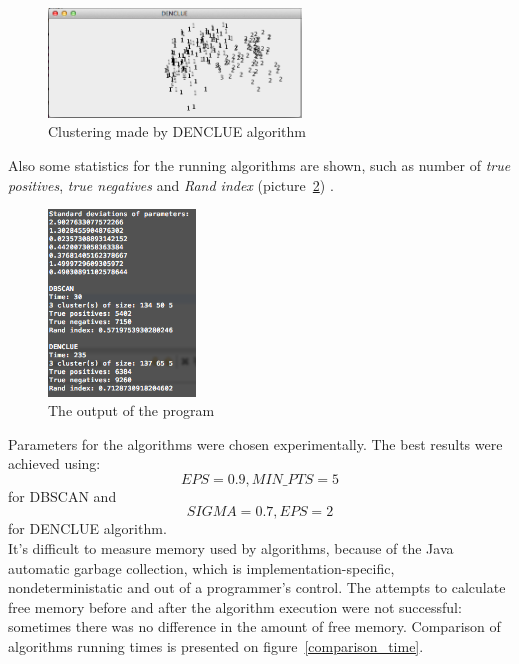 \documentclass[12pt, a4paper, notitlepage, oneside]{article}
\begin{document}
\begin{figure}[!ht]
 	\centering
	\includegraphics[width=0.6\textwidth]{images/denclue.png}
 	\caption[]
	{Clustering made by DENCLUE algorithm}
		\label{denclue}
	\end{figure}

Also some statistics for the running algorithms are shown, such as number of \textit{true positives}, \textit{true negatives} and \textit{Rand index} (picture~\ref{result}) \cite{rand}.

\begin{figure}[!ht]
 	\centering
	\includegraphics[width=0.35\textwidth]{images/results.png}
 	\caption[]
	{The output of the program}
		\label{result}
\end{figure}

Parameters for the algorithms were chosen experimentally. The best results were achieved using: 
$$EPS = 0.9, MIN\_PTS = 5$$
for DBSCAN and
$$SIGMA = 0.7, EPS = 2$$
for DENCLUE algorithm. \\

It's difficult to measure memory used by algorithms, because of the Java automatic garbage collection, 
which is implementation-specific, nondeterministatic and out of a programmer's control. 
The attempts to calculate free memory before and after the algorithm execution 
were not successful: sometimes there was no difference in the amount of free memory.
Comparison of algorithms running times is presented on figure~\ref{comparison_time}. \\
\end{document}
